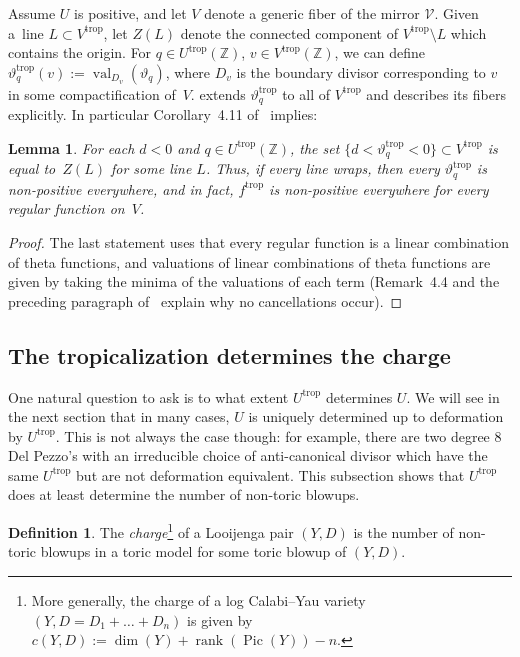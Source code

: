 \documentclass[pdftex]{sigma}
\numberwithin{equation}{section}
\numberwithin{figure}{section}
\numberwithin{table}{section}
\DeclareMathOperator{\Pic}{Pic}
\DeclareMathOperator{\rank}{rank}
\DeclareMathOperator{\val}{val}
\DeclareMathOperator{\trop}{trop}
\let\bb=\mathbb
\let\s=\mathcal
\newtheorem{lem}[thm]{Lemma}
\theoremstyle{definition}
\newtheorem{dfn}[thm]{Definition}
\begin{document}
Assume $U$ is positive, and let $V$ denote a generic fiber of the mirror $\s{V}$. Given a~line \mbox{$L\subset V^{\trop}$}, let $Z(L)$ denote the connected component of $V^{\trop}\setminus L$ which contains the origin. For $q\in U^{\trop}(\bb{Z})$, $v\in V^{\trop}(\bb{Z})$, we can define $\vartheta_q^{\trop}(v):=\val_{D_v}(\vartheta_q)$, where $D_v$ is the boundary divisor corresponding to $v$ in some compactification of~$V$. \cite{Man1} extends $\vartheta_q^{\trop}$ to all of $V^{\trop}$ and describes its fibers explicitly. In particular Corollary~4.11 of~\cite{Man1} implies:
\begin{lem}\label{NegativeFibers}
For each $d<0$ and $q\in U^{\trop}(\bb{Z})$, the set $\big\{d<\vartheta_q^{\trop}<0\big\}\subset V^{\trop}$ is equal to~$Z(L)$ for some line $L$. Thus, if every line wraps, then every $\vartheta_q^{\trop}$ is non-positive everywhere, and in fact, $f^{\trop}$ is non-positive everywhere for every regular function on~$V$.
\end{lem}
\begin{proof}
The last statement uses that every regular function is a linear combination of theta functions, and valuations of linear combinations of theta functions are given by taking the minima of the valuations of each term (Remark~4.4 and the preceding paragraph of~\cite{Man1} explain why no cancellations occur).
\end{proof}

\subsection{The tropicalization determines the charge}\label{trop-charge}

One natural question to ask is to what extent $U^{\trop}$ determines $U$. We will see in the next section that in many cases, $U$ is uniquely determined up to deformation by $U^{\trop}$. This is not always the case though: for example, there are two degree $8$ Del Pezzo's with an irreducible choice of anti-canonical divisor which have the same $U^{\trop}$ but are not deformation equivalent. This subsection shows that $U^{\trop}$ does at least determine the number of non-toric blowups.

\begin{dfn}The {\it charge}\footnote{More generally, the charge of a log Calabi--Yau variety $(Y,D=D_1+\dots+D_n)$ is given by $c(Y,D):=\dim(Y)+\rank(\Pic(Y))-n$.} of a Looijenga pair $(Y,D)$ is the number of non-toric blowups in a toric model for some toric blowup of $(Y,D)$.
\end{dfn}
\end{document}
